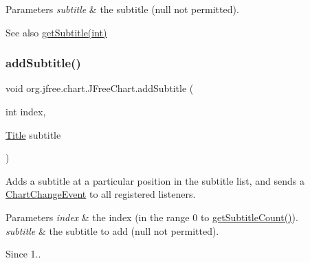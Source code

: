 \begin{DoxyParams}{Parameters}
{\em subtitle} & the subtitle ({\ttfamily null} not permitted).\\
\hline
\end{DoxyParams}
\begin{DoxySeeAlso}{See also}
\mbox{\hyperlink{classorg_1_1jfree_1_1chart_1_1_j_free_chart_a4eb1ebe0bedff91b3343cf1a71ecbade}{get\+Subtitle(int)}} 
\end{DoxySeeAlso}
\mbox{\label{classorg_1_1jfree_1_1chart_1_1_j_free_chart_a4c51318305b6f49bceafb9132c5ccd0c}} 
\subsubsection{\texorpdfstring{add\+Subtitle()}{addSubtitle()}\hspace{0.1cm}{\footnotesize\ttfamily [2/2]}}
{\footnotesize\ttfamily void org.\+jfree.\+chart.\+J\+Free\+Chart.\+add\+Subtitle (\begin{DoxyParamCaption}\item[{int}]{index,  }\item[{\mbox{\hyperlink{classorg_1_1jfree_1_1chart_1_1title_1_1_title}{Title}}}]{subtitle }\end{DoxyParamCaption})}

Adds a subtitle at a particular position in the subtitle list, and sends a \mbox{\hyperlink{}{Chart\+Change\+Event}} to all registered listeners.


\begin{DoxyParams}{Parameters}
{\em index} & the index (in the range 0 to \mbox{\hyperlink{classorg_1_1jfree_1_1chart_1_1_j_free_chart_aea3529a3eb5a3c86a1bf60238bbbfd41}{get\+Subtitle\+Count()}}). \\
\hline
{\em subtitle} & the subtitle to add ({\ttfamily null} not permitted).\\
\hline
\end{DoxyParams}
\begin{DoxySince}{Since}
1.. 
\end{DoxySince}
\mbox{\label{classorg_1_1jfree_1_1chart_1_1_j_free_chart_aa1ac67940797332b676a8dd7a604ed78}} 
